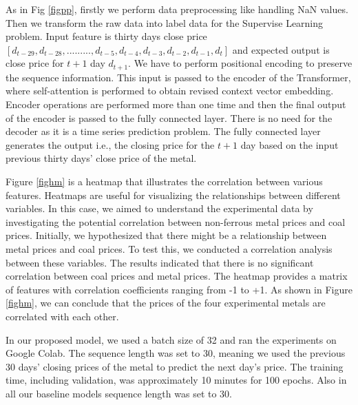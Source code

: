\documentclass[preprint,12pt]{elsarticle}
\begin{document}
\par As in Fig \ref{figpp}, firstly we perform data preprocessing like handling NaN values. Then we transform the raw data into label data for the Supervise Learning problem. Input feature is thirty days close price $[d_{t-29},d_{t-28},........., d_{t-5},d_{t-4},d_{t-3},d_{t-2},d_{t-1},d_{t}]$ and expected output is close price for $t+1$ day $d_{t+1}$. We have to perform positional encoding to preserve the sequence information. This input is passed to the encoder of the Transformer, where self-attention is performed to obtain revised context vector embedding. Encoder operations are performed more than one time and then the final output of the encoder is passed to the fully connected layer. There is no need for the decoder as it is a time series prediction problem. The fully connected layer generates the output i.e., the closing price for the $t+1$ day based on the input previous thirty days' close price of the metal.

\par Figure \ref{fighm} is a heatmap that illustrates the correlation between various features. Heatmaps are useful for visualizing the relationships between different variables. In this case, we aimed to understand the experimental data by investigating the potential correlation between non-ferrous metal prices and coal prices.
Initially, we hypothesized that there might be a relationship between metal prices and coal prices. To test this, we conducted a correlation analysis between these variables. The results indicated that there is no significant correlation between coal prices and metal prices.
The heatmap provides a matrix of features with correlation coefficients ranging from -1 to +1. As shown in Figure \ref{fighm}, we can conclude that the prices of the four experimental metals are correlated with each other.
\par In our proposed model, we used a batch size of 32 and ran the experiments on Google Colab. The sequence length was set to 30, meaning we used the previous 30 days' closing prices of the metal to predict the next day's price. The training time, including validation, was approximately 10 minutes for 100 epochs. Also in all our baseline models sequence length was set to 30.
\end{document}
